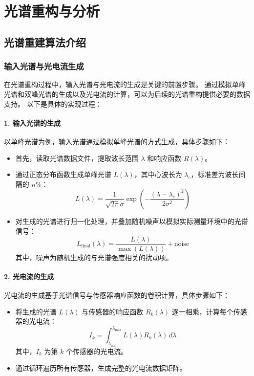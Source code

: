 \documentclass[12pt,hyperref,a4paper,UTF8]{ctexart}
\begin{document}
\newpage
\section{光谱重构与分析}




\subsection{光谱重建算法介绍}


\subsubsection*{输入光谱与光电流生成}

在光谱重构过程中，输入光谱与光电流的生成是关键的前置步骤。
通过模拟单峰光谱和双峰光谱的生成以及光电流的计算，可以为后续的光谱重构提供必要的数据支持。
以下是具体的实现过程：

\paragraph{1. 输入光谱的生成}
以单峰光谱为例，输入光谱通过模拟单峰光谱的方式生成，具体步骤如下：
\begin{itemize}
    \item 首先，读取光谱数据文件，提取波长范围 \(\lambda\) 和响应函数 \(R(\lambda)\)。
    \item 通过正态分布函数生成单峰光谱 \(L(\lambda)\)，其中心波长为 \(\lambda_c\)，标准差为波长间隔的 \(n\%\)：
    \[
    L(\lambda) = \frac{1}{\sqrt{2\pi}\sigma} \exp\left(-\frac{(\lambda - \lambda_c)^2}{2\sigma^2}\right)
    \]
    \item 对生成的光谱进行归一化处理，并叠加随机噪声以模拟实际测量环境中的光谱信号：
    \[
    L_{\text{final}}(\lambda) = \frac{L(\lambda)}{\max(L(\lambda))} + \text{noise}
    \]
    其中，噪声为随机生成的与光谱强度相关的扰动项。
\end{itemize}

\paragraph{2. 光电流的生成}
光电流的生成基于光谱信号与传感器响应函数的卷积计算，具体步骤如下：
\begin{itemize}
    \item 将生成的光谱 \(L(\lambda)\) 与传感器的响应函数 \(R_k(\lambda)\) 逐一相乘，计算每个传感器的光电流：
    \[
    I_k = \int_{\lambda_{\text{min}}}^{\lambda_{\text{max}}} L(\lambda) R_k(\lambda) \, d\lambda
    \]
    其中，\(I_k\) 为第 \(k\) 个传感器的光电流。
    \item 通过循环遍历所有传感器，生成完整的光电流数据矩阵。
\end{itemize}
\end{document}
